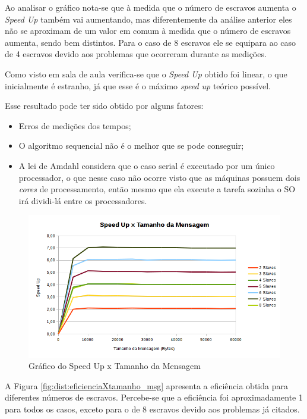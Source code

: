\documentclass[
	12pt,				%
    oneside,			%
	a4paper,			%
	english,			%
	brazil,				%
	]{abntex2}
\begin{document}
Ao analisar o gráfico nota-se que à medida que o número de escravos aumenta o \textit{Speed Up} também vai aumentando, mas diferentemente da análise anterior eles não se aproximam de um valor em comum à medida que o número de escravos aumenta, sendo bem distintos. Para o caso de 8 escravos ele se equipara ao caso de 4 escravos devido aos problemas que ocorreram durante as medições. 

Como visto em sala de aula verifica-se que o \textit{Speed Up} obtido foi linear, o que inicialmente é estranho, já que 
esse é o máximo \textit{speed up} teórico possível.

Esse resultado pode ter sido obtido por alguns fatores:

\begin{itemize}
	\item Erros de medições dos tempos;
	\item O algoritmo sequencial não é o melhor que se pode conseguir;
	\item A lei de Amdahl considera que o caso serial é executado por um único processador, o que nesse caso não ocorre visto 
	que as máquinas possuem dois \textit{cores} de processamento, então mesmo que ela execute a tarefa sozinha o SO irá 
	dividi-lá entre os processadores.
\end{itemize}

\begin{figure}[!htb]
\centering
\includegraphics[scale=0.65]{figuras/speedup_distribuido.png}
\caption{Gráfico do Speed Up x Tamanho da Mensagem}
\label{fig:dist:speedupXtamanho_msg}
\end{figure}


A Figura \ref{fig:dist:eficienciaXtamanho_msg} apresenta a eficiência obtida para diferentes números de escravos. Percebe-se 
que a eficiência foi aproximadamente 1 para todos os casos, exceto para o de 8 escravos devido aos problemas já citados.
\end{document}
